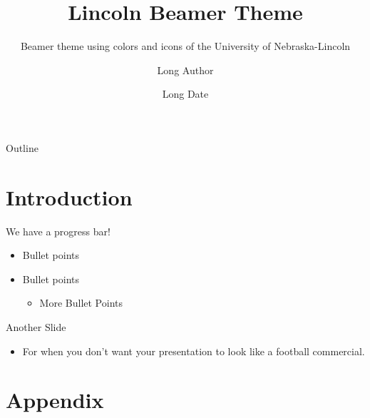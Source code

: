 \documentclass[aspectratio=169]{beamer}
\title{Lincoln Beamer Theme}
\subtitle{Beamer theme using colors and icons of the University of Nebraska-Lincoln}
\author[Short Author]{Long Author}
\institute{\\University of Nebraska-Lincoln}
\date[Short Date]{Long Date}
\begin{document}
\begin{frame}
  \titlepage
\end{frame}
\begin{frame}{Outline}
  \tableofcontents
\end{frame}

\section{Introduction}
\begin{frame}
\sectionpage
\end{frame}

\begin{frame}{We have a progress bar!}
    \begin{itemize}
        \item Bullet points
        \item Bullet points
        \begin{itemize}
            \item More Bullet Points
        \end{itemize}
    \end{itemize}
\end{frame}

\begin{frame}{Another Slide}
    \begin{itemize}
        \item For when you don't want your presentation to look like a football commercial.
    \end{itemize}
\end{frame}


\appendix

\beginappendix

\section{Appendix}

\finishappendix
\end{document}
